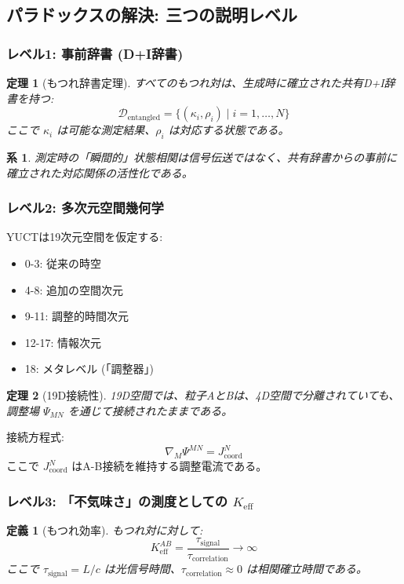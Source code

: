 \documentclass[11pt,a4paper]{article}
\newtheorem{theorem}{定理}
\newtheorem{definition}{定義}
\newtheorem{corollary}{系}
\begin{document}
	\subsection{パラドックスの解決: 三つの説明レベル}
	\label{subsec:three-levels}
	
	\subsubsection{レベル1: 事前辞書 (D+I辞書)}
	\begin{theorem}[もつれ辞書定理]
		すべてのもつれ対は、生成時に確立された共有D+I辞書を持つ:
		\begin{equation}
			\mathcal{D}_{\text{entangled}} = \{(\kappa_i, \rho_i) \mid i = 1,\dots,N\}
		\end{equation}
		ここで $\kappa_i$ は可能な測定結果、$\rho_i$ は対応する状態である。
	\end{theorem}
	
	\begin{corollary}
		測定時の「瞬間的」状態相関は信号伝送ではなく、共有辞書からの事前に確立された対応関係の活性化である。
	\end{corollary}
	
	\subsubsection{レベル2: 多次元空間幾何学}
	YUCTは19次元空間を仮定する:
	\begin{itemize}
		\item 0-3: 従来の時空
		\item 4-8: 追加の空間次元
		\item 9-11: 調整的時間次元
		\item 12-17: 情報次元
		\item 18: メタレベル (「調整器」)
	\end{itemize}
	
	\begin{theorem}[19D接続性]
		19D空間では、粒子AとBは、4D空間で分離されていても、調整場 $\Psi_{MN}$ を通じて接続されたままである。
	\end{theorem}
	
	接続方程式:
	\begin{equation}
		\nabla_M \Psi^{MN} = J^N_{\text{coord}}
	\end{equation}
	ここで $J^N_{\text{coord}}$ はA-B接続を維持する調整電流である。
	
	\subsubsection{レベル3: 「不気味さ」の測度としての $K_{\mathrm{eff}}$}
	\begin{definition}[もつれ効率]
		もつれ対に対して:
		\begin{equation}
			K_{\mathrm{eff}}^{AB} = \frac{\tau_{\text{signal}}}{\tau_{\text{correlation}}} \to \infty
		\end{equation}
		ここで $\tau_{\text{signal}} = L/c$ は光信号時間、$\tau_{\text{correlation}} \approx 0$ は相関確立時間である。
	\end{definition}
	
\end{document}
